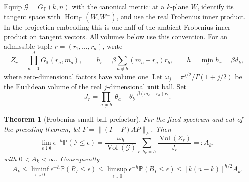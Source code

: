 \documentclass[11pt]{article}
\newtheorem{theorem}{Theorem}
\newcommand{\Pp}{\mathbb P}
\begin{document}
Equip $\mathcal G=G_{\mathbb F}(k,n)$ with the canonical metric: at a $k$-plane $W$, identify its tangent space with $\operatorname{Hom}_{\mathbb F}(W,W^\perp)$, and use the real Frobenius inner product. In the projection embedding this is one half of the ambient Frobenius inner product on tangent vectors. All volumes below use this convention. For an admissible tuple $r=(r_1,\ldots,r_d)$, write
\[
 Z_r=\prod_{a=1}^d G_{\mathbb F}(r_a,m_a),\qquad
 h_r=\beta\sum_{a\ne b}(m_a-r_a)r_b,\qquad h=\min_r h_r=\beta d_k,
\]
where zero-dimensional factors have volume one. Let $\omega_j=\pi^{j/2}/\Gamma(1+j/2)$ be the Euclidean volume of the real $j$-dimensional unit ball. Set
\[
 J_r=\prod_{a\ne b}|\theta_a-\theta_b|^{\beta(m_a-r_a)r_b}.
\]
\begin{theorem}[Frobenius small-ball prefactor]\label{thm:prefactor}
For the fixed spectrum and cut of the preceding theorem, let $F=\|(I-P)\Lambda P\|_F$. Then
\begin{equation}\label{eq:prefactor}
 \lim_{\epsilon\downarrow0}\epsilon^{-h}\Pp(F\le\epsilon)
 =\frac{\omega_h}{\operatorname{Vol}(\mathcal G)}
 \sum_{r:h_r=h}\frac{\operatorname{Vol}(Z_r)}{J_r}=:A_k,
\end{equation}
with $0<A_k<\infty$. Consequently
\[
 A_k\le\liminf_{\epsilon\downarrow0}\epsilon^{-h}\Pp(B_I\le\epsilon)
 \le\limsup_{\epsilon\downarrow0}\epsilon^{-h}\Pp(B_I\le\epsilon)
 \le [k(n-k)]^{h/2} A_k.
\]
\end{theorem}
\end{document}
